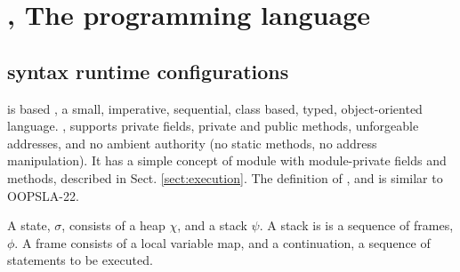 \section{\LangOO, The programming language }  

\subsection{\LangOO syntax runtime configurations}
\label{sub:Loo} 
 is based
 \LangOO, a {small}, imperative, sequential,  class based, typed, object-oriented language. 
 ,  \LangOO supports private fields, private and public methods, unforgeable addresses, and no ambient authority (no static methods, no address manipulation).
 It has a simple concept of module with module-private fields and methods, described in Sect. \ref{sect:execution}.
 The definition of , and is  similar to   OOPSLA-22.

A \LangOO state, $\sigma$,  consists of a  heap $\chi$, and a   stack $\psi$. A stack is is a sequence of frames, $\phi$.
A frame consists of a local variable map, and a continuation, \ie a sequence of statements to be executed.


 
